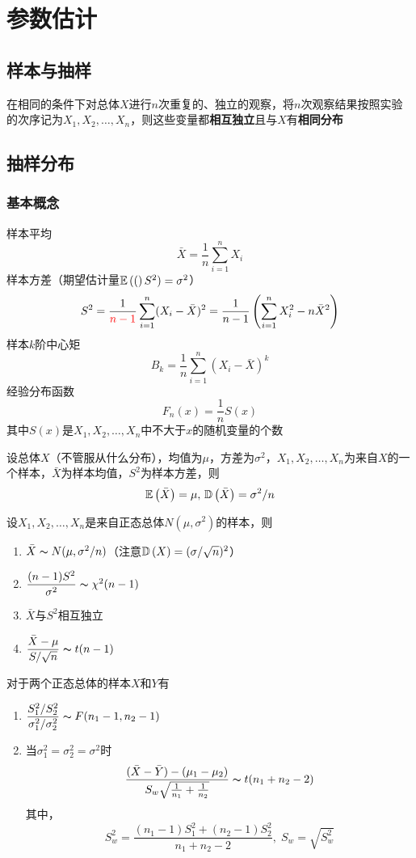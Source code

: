 
\section{参数估计}
\subsection{样本与抽样}
\begin{definition}[简单随机样本]
在相同的条件下对总体$X$进行$n$次重复的、独立的观察，将$n$次观察结果按照实验的次序记为$X_1,X_2,\ldots,X_n$，则这些变量都\textbf{相互独立}且与$X$有\textbf{相同分布}
\end{definition}

\subsection{抽样分布}
\subsubsection{基本概念}
\begin{definition}[统计量]
样本平均
\[\bar{X}=\frac{1}{n}\sum_{i=1}^nX_i\]
样本方差（期望估计量$\mathbb{E}\left((\right)S^2)=\sigma^2$）
\[S^2=\frac{1}{\textcolor{red}{n-1}}\sum_{i=1}^n(X_i-\bar{X})^2=\frac{1}{n-1}\left(\sum_{i=1}^nX_i^2-n\bar{X}^2\right)\]
样本$k$阶中心矩
\[B_k=\frac{1}{n}\sum_{i=1}^n(X_i-\bar{X})^k\]
经验分布函数
\[F_n(x)=\frac{1}{n}S(x)\]
其中$S(x)$是$X_1,X_2,\ldots,X_n$中不大于$x$的随机变量的个数
\end{definition}
\begin{theorem}
设总体$X$（不管服从什么分布），均值为$\mu$，方差为$\sigma^2$，$X_1,X_2,\ldots,X_n$为来自$X$的一个样本，$\bar{X}$为样本均值，$S^2$为样本方差，则
\[\mathbb{E}\left(\bar{X}\right)=\mu,\,\mathbb{D}\left(\bar{X}\right)=\sigma^2/n\]
\end{theorem}
\begin{theorem}
设$X_1,X_2,\ldots,X_n$是来自正态总体$N(\mu,\sigma^2)$的样本，则
\begin{enumerate}
	\item $\bar{X}\thicksim N(\mu,\sigma^2/n)$（注意$\mathbb{D}\left(X\right)=(\sigma/\sqrt{n})^2$）
	\item $\dfrac{(n-1)S^2}{\sigma^2}\thicksim \chi^2(n-1)$
	\item $\bar{X}$与$S^2$相互独立
	\item $\dfrac{\bar{X}-\mu}{S/\sqrt{n}}\thicksim t(n-1)$
\end{enumerate}
\end{theorem}
\begin{theorem}
对于两个正态总体的样本$X$和$Y$有
\begin{enumerate}
	\item $\displaystyle \frac{S_1^2/S_2^2}{\sigma_1^2/\sigma_2^2}\thicksim F(n_1-1,n_2-1)$
	\item 当$\sigma_1^2=\sigma_2^2=\sigma^2$时
	\[\frac{(\bar{X}-\bar{Y})-(\mu_1-\mu_2)}{S_w\sqrt{\frac{1}{n_1}+\frac{1}{n_2}}}\thicksim t(n_1+n_2-2)\]
	其中，
	\[S_w^2=\frac{(n_1-1)S_1^2+(n_2-1)S_2^2}{n_1+n_2-2},\;S_w=\sqrt{S_w^2}\]
\end{enumerate}
\end{theorem}

